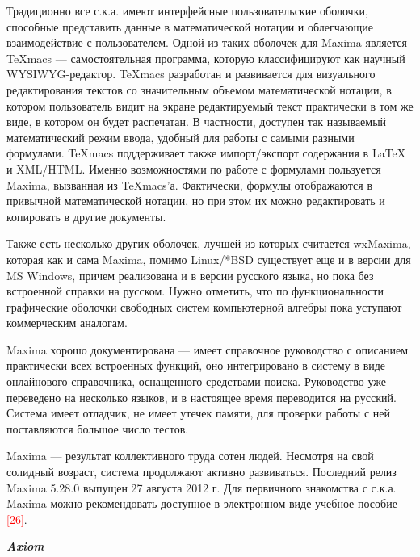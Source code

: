 Традиционно все с.к.а. имеют интерфейсные пользовательские оболочки, способные представить данные в математической нотации и облегчающие взаимодействие с пользователем. Одной из таких оболочек для Maxima является TeXmacs --- самостоятельная программа, которую классифицируют как научный WYSIWYG-редактор. TeXmacs разработан и развивается для визуального редактирования текстов со значительным объемом математической нотации, в котором пользователь видит на экране редактируемый текст практически в том же виде, в котором он будет распечатан. В частности, доступен так называемый математический режим ввода, удобный для работы с самыми разными формулами. TeXmacs поддерживает также импорт/экспорт содержания в LaTeX и XML/HTML. Именно возможностями по работе с формулами пользуется Maxima, вызванная из TeXmacs’а. Фактически, формулы отображаются в привычной математической нотации, но при этом их можно редактировать и копировать в другие документы.

Также есть несколько других оболочек, лучшей из которых считается wxMaxima, которая как и сама Maxima, помимо Linux/*BSD существует еще и в версии для MS Windows, причем реализована и в версии русского языка, но пока без встроенной справки на русском. Нужно отметить, что по функциональности графические оболочки свободных систем компьютерной алгебры пока уступают коммерческим аналогам.

Maxima хорошо документирована --- имеет справочное руководство с описанием практически всех встроенных функций, оно интегрировано в систему в виде онлайнового справочника, оснащенного средствами поиска. Руководство уже переведено на несколько языков, и в настоящее время переводится на русский. Система имеет отладчик, не имеет утечек памяти, для проверки работы с ней поставляются большое число тестов.

Maxima --- результат коллективного труда сотен людей. Несмотря на свой солидный возраст, система продолжают активно развиваться. Последний релиз Maxima 5.28.0 выпущен 27 августа 2012 г. Для первичного знакомства с с.к.а. Maxima можно рекомендовать доступное в электронном виде учебное пособие \textcolor{red}{[26]}.

\textbf{\textit{Axiom}}

